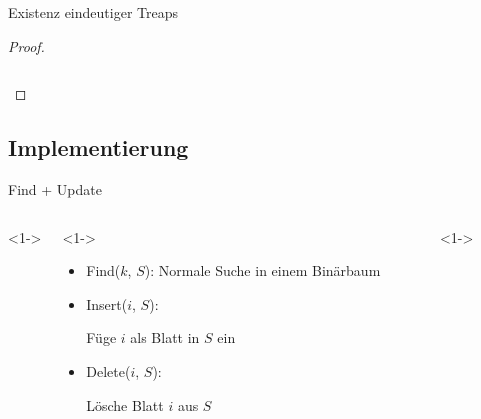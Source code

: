 \documentclass[t]{beamer}
\theoremstyle{plain}
\begin{document}
\begin{frame}{Existenz eindeutiger Treaps}
{\begin{proof}
{\begin{columns}
\begin{column}[t]{0.35\textwidth}
        \end{column}
        \end{columns}}
    \end{proof}}
\end{frame}

\subsection{Implementierung}
\begin{frame}{Find + Update}
    \begin{columns}<1->
    \begin{column}{.65\textwidth}<1->
        \begin{itemize}
            \item<1> Find($k$, $S$): Normale Suche in einem Binärbaum
            \item<2> Insert($i$, $S$):
                \begin{algorithm}[H]
                    Füge $i$ als Blatt in $S$ ein \;
                \end{algorithm}
            \item<3> Delete($i$, $S$):
                \begin{algorithm}[H]
                    Lösche Blatt $i$ aus $S$ \;
                \end{algorithm}
        \end{itemize}
    \end{column}
    \begin{column}{.35\textwidth}<1->
        \raisebox{-\totalheight}{
}
\end{column}
\end{columns}
\end{frame}
\end{document}
